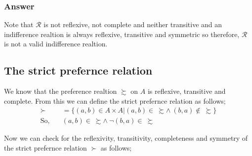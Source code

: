 \documentclass[12pt,a4paper]{article}
\begin{document}
    \subsubsection*{Answer} 
   Note that \(\mathcal{R}\) is not reflexive, not complete and neither transitive and an indifference realtion is always reflexive, transitive and symmetric so therefore, \(\mathcal{R}\) is not a valid indifference realtion.
   
    \subsection{The strict prefernce relation} 

    We know that the preference realtion \(\succsim \) on \(A\) is reflexive, transitive and complete. From this we can define the strict prefernce relation as follows;
     \begin{align*}
         \succ \ &= \{(a,b) \in A \times A | (a,b) \in \ \succsim \wedge \ (b,a) \notin \ \succsim \} \\
        \text{So}, \quad & (a,b) \in \ \succsim \wedge \ \neg(b,a) \in \ \succsim
    \end{align*}

    Now we can check for the reflexivity, transitivity, completeness and symmetry of the strict prefernce relation \(\succ \) as follows;
    
\end{document}

